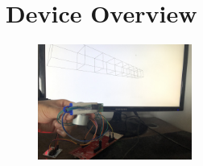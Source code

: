 \documentclass[12pt]{article}
\begin{document}
\section*{Device Overview}
\begin{paracol}{2}
    \begin{figure}[h]
        \centering
        \includegraphics[width=0.45\textwidth]{SystemOverview.jpg} 
        \label{fig:SystemOverview}      
    \end{figure}

\end{paracol}
\end{document}
